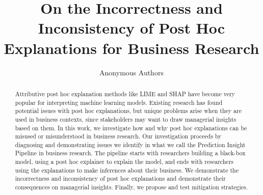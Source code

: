 \documentclass[12pt]{article}    %
\date{}
\begin{document}
\title{On the Incorrectness and Inconsistency of Post Hoc Explanations for Business Research}

\author{Anonymous Authors}






\maketitle

\begin{abstract}
Attributive post hoc explanation methods like LIME and SHAP have become very popular for
interpreting machine learning models. Existing research has found potential issues with post hoc explanations, but unique problems arise when they are used in business contexts, since stakeholders may want to draw managerial insights
based on them. In this work, we investigate how and why post hoc explanations can be misused or
misunderstood in business research. Our investigation proceeds by diagnosing and demonstrating
issues we identify in what we call the Prediction Insight Pipeline in business research. The pipeline
starts with researchers building a black-box model, using a post hoc explainer to explain the model, and ends with researchers using the explanations to make inferences about their business. We demonstrate the incorrectness and inconsistency of post hoc explanations and demonstrate their consequences on managerial insights. Finally, we propose and test mitigation strategies. 
\end{abstract}%
%

\end{document}
